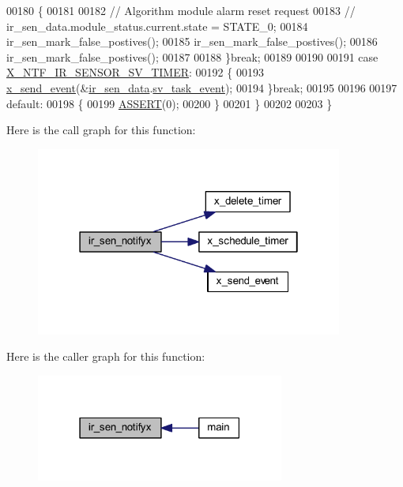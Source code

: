\begin{DoxyCode}
00180         \{
00181 
00182            \textcolor{comment}{// Algorithm module alarm reset request}
00183             \textcolor{comment}{// ir\_sen\_data.module\_status.current.state = STATE\_0;}
00184              ir\_sen\_mark\_false\_postives();
00185              ir\_sen\_mark\_false\_postives();
00186              ir\_sen\_mark\_false\_postives();
00187 
00188         \}\textcolor{keywordflow}{break};
00189 
00190 
00191         \textcolor{keywordflow}{case} \hyperlink{a00023_a3b0f15b601361fafa871c5e49df7842d}{X\_NTF\_IR\_SENSOR\_SV\_TIMER}:
00192         \{
00193            \hyperlink{a00036_a4bc3d03c8d62c8237329ed4e969fbc1b}{x\_send\_event}(&\hyperlink{a00045_a73dfacb46242746440accc76c7ef710d}{ir\_sen\_data}.\hyperlink{a00023_a43c345f39ea3aefbb60ef1ef57fe5d83}{sv\_task\_event});
00194         \}\textcolor{keywordflow}{break};
00195 
00196 
00197         \textcolor{keywordflow}{default}:
00198         \{
00199             \hyperlink{a00072_abb8ff8e213ac9f6fb21d2b968583b936}{ASSERT}(0);
00200         \}
00201     \}
00202 
00203 \}
\end{DoxyCode}


Here is the call graph for this function\+:\nopagebreak
\begin{figure}[H]
\begin{center}
\leavevmode
\includegraphics[width=286pt]{d4/d51/a00017_a36c6c2cdf9aa5844371e742330789dad_cgraph}
\end{center}
\end{figure}




Here is the caller graph for this function\+:\nopagebreak
\begin{figure}[H]
\begin{center}
\leavevmode
\includegraphics[width=231pt]{d4/d51/a00017_a36c6c2cdf9aa5844371e742330789dad_icgraph}
\end{center}
\end{figure}


